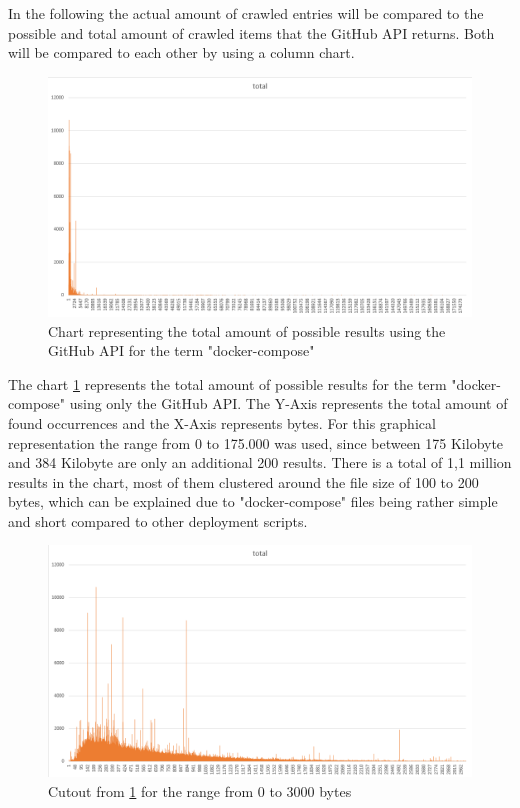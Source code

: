 In the following the actual amount of crawled entries will be compared to the possible and total amount of crawled items that the GitHub API returns. Both will be compared to each other by using a column chart.

\begin{figure}[H]
    \centering
    \includegraphics[scale=0.5]{graphics/stats_total.png}
    \caption{Chart representing the total amount of possible results using the GitHub API for the term "docker-compose"}
    \label{fig:stats_total}
\end{figure}

The chart \ref{fig:stats_total} represents the total amount of possible results for the term "docker-compose" using only the GitHub API. The Y-Axis represents the total amount of found occurrences and the X-Axis represents bytes. For this graphical representation the range from 0 to 175.000 was used, since between 175 Kilobyte and 384 Kilobyte are only an additional 200 results. There is a total of 1,1 million results in the chart, most of them clustered around the file size of 100 to 200 bytes, which can be explained due to "docker-compose" files being rather simple and short compared to other deployment scripts. 

\begin{figure}[H]
    \centering
    \includegraphics[scale=0.5]{graphics/stats_range.png}
    \caption{Cutout from \ref{fig:stats_total} for the range from 0 to 3000 bytes }
    \label{fig:stats_range}
\end{figure}

